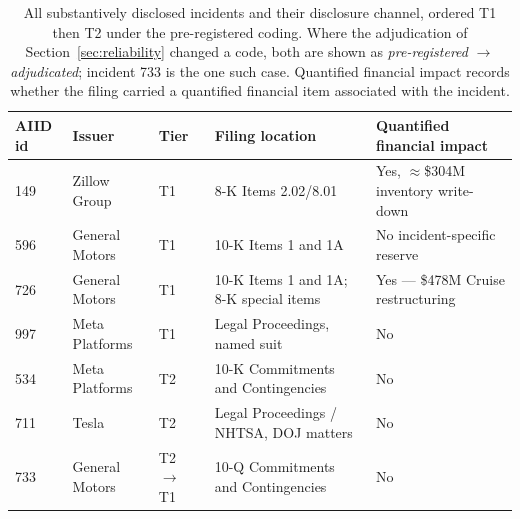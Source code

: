 \documentclass[utf8]{FrontiersinHarvard}
\begin{document}
\begin{table}[h!]
\caption{All substantively disclosed incidents and their disclosure channel, ordered T1 then T2 under the pre-registered coding. Where the adjudication of Section~\ref{sec:reliability} changed a code, both are shown as \emph{pre-registered} $\rightarrow$ \emph{adjudicated}; incident 733 is the one such case. Quantified financial impact records whether the filing carried a quantified financial item associated with the incident.}
\label{tab:acct}
\small
\begin{center}
\begin{tabular}{@{}llllp{3.9cm}@{}}
\toprule
AIID id & Issuer & Tier & Filing location & Quantified financial impact \\ \midrule
149 & Zillow Group & T1 & 8-K Items 2.02/8.01 & Yes, $\approx$\$304M inventory write-down \\
596 & General Motors & T1 & 10-K Items 1 and 1A & No incident-specific reserve \\
726 & General Motors & T1 & 10-K Items 1 and 1A; 8-K special items & Yes --- \$478M Cruise restructuring \\
997 & Meta Platforms & T1 & Legal Proceedings, named suit & No \\
534 & Meta Platforms & T2 & 10-K Commitments and Contingencies & No \\
711 & Tesla & T2 & Legal Proceedings / NHTSA, DOJ matters & No \\
733 & General Motors & T2 $\rightarrow$ T1 & 10-Q Commitments and Contingencies & No \\
\bottomrule
\end{tabular}
\end{center}
\end{table}
\end{document}

